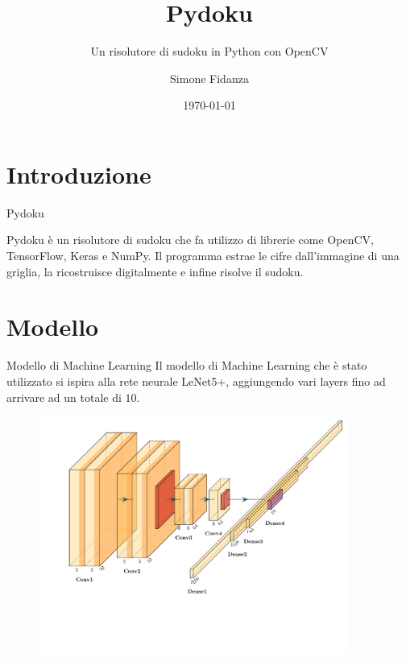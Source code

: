 \documentclass[10pt]{beamer}
\title{Pydoku}
\subtitle{Un risolutore di sudoku in Python con OpenCV}
\date{\today}
\author{Simone Fidanza}
\institute{Università degli studi di Bari ``Aldo Moro''}
\begin{document}
\maketitle

\section[Introduzione]{Introduzione}

\begin{frame}[fragile]{Pydoku}

    Pydoku è un risolutore di sudoku che fa utilizzo di librerie come OpenCV,
    TensorFlow, Keras e NumPy. Il programma estrae le cifre dall'immagine di
    una griglia, la ricostruisce digitalmente e infine risolve il sudoku.

\end{frame}

\section{Modello}

\begin{frame}{Modello di Machine Learning}
    Il modello di Machine Learning che è stato utilizzato si ispira alla rete
    neurale LeNet5+, aggiungendo vari layers fino ad arrivare ad un totale di \(10\).

    \vfill
    \begin{figure}
        \includegraphics[width=0.9\textwidth, trim = 1cm 4.5cm 0cm 1cm]{architecture.pdf}
    \end{figure}

\end{frame}
\end{document}
